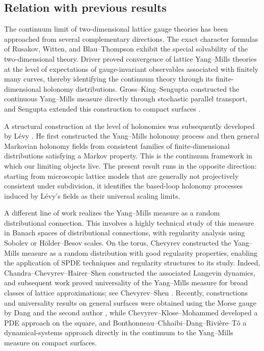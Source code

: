 \documentclass[11pt,a4paper,reqno]{article}
\theoremstyle{definition}
\theoremstyle{remark}
\begin{document}
\subsection{Relation with previous results}

The continuum limit of two-dimensional lattice gauge theories has been approached from several complementary directions. The exact character formulas of Rusakov, Witten, and Blau--Thompson \cite{Rus90,Wit91,BlauThom92} exhibit the special solvability of the two-dimensional theory. Driver \cite{Dri89} proved convergence of lattice Yang--Mills theories at the level of expectations of gauge-invariant observables associated with finitely many curves, thereby identifying the continuum theory through its finite-dimensional holonomy distributions. Gross--King--Sengupta \cite{GKS89} constructed the continuous Yang--Mills measure directly through stochastic parallel transport, and Sengupta extended this construction to compact surfaces \cite{Sen97}.

A structural construction at the level of holonomies was subsequently developed by L\'evy \cite{Lev03,Lev10}. He first constructed the Yang--Mills holonomy process and then general Markovian holonomy fields from consistent families of finite-dimensional distributions satisfying a Markov property. This is the continuum framework in which our limiting objects live. The present result runs in the opposite direction: starting from microscopic lattice models that are generally not projectively consistent under subdivision, it identifies the based-loop holonomy processes induced by L\'evy's fields as their universal scaling limits.

A different line of work realizes the Yang--Mills measure as a random distributional connection. This involves a highly technical study of this measure in Banach spaces of distributional connections, with regularity analysis using Sobolev or H\"older--Besov scales. On the torus, Chevyrev \cite{Chev19} constructed the Yang--Mills measure as a random distribution with good regularity properties, enabling the application of SPDE techniques and regularity structures to its study. Indeed, Chandra--Chevyrev--Hairer--Shen \cite{CCHS22} constructed the associated Langevin dynamics, and subsequent work proved universality of the Yang--Mills measure for broad classes of lattice approximations; see Chevyrev--Shen \cite{ChevShen26}. Recently, constructions and universality results on general surfaces were obtained using the Morse gauge by Dang and the second author \cite{DangNohra26}, while Chevyrev--Klose--Mohammed \cite{CKM} developed a PDE approach on the square, and Bonthonneau--Chhaibi--Dang--Rivi\`ere--T\^o \cite{BCDRT26} a dynamical-systems approach directly in the continuum to the Yang--Mills measure on compact surfaces.
\end{document}
